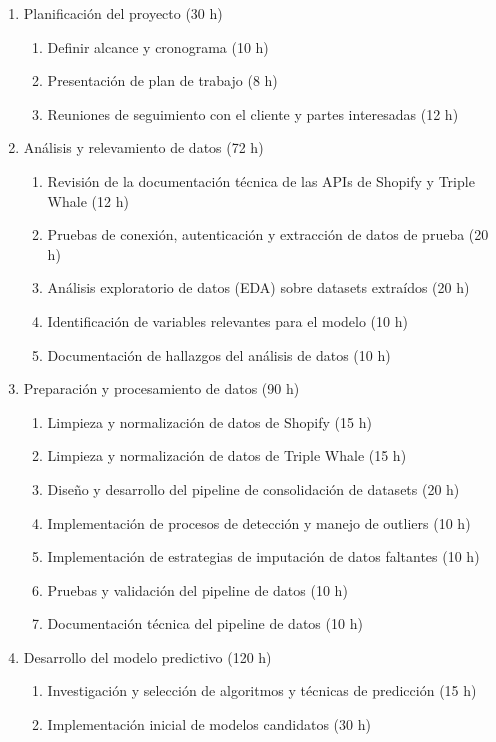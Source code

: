 \documentclass[
11pt, %
]{charter}
\begin{document}
\begin{enumerate}
\item Planificación del proyecto (30 h)
\begin{enumerate}

\item Definir alcance y cronograma (10 h)
\item Presentación de plan de trabajo (8 h)
\item Reuniones de seguimiento con el cliente y partes interesadas (12 h)
\end{enumerate}
\item Análisis y relevamiento de datos (72 h)
\begin{enumerate}
\item Revisión de la documentación técnica de las APIs de Shopify y Triple Whale (12 h)
\item Pruebas de conexión, autenticación y extracción de datos de prueba (20 h)
\item Análisis exploratorio de datos (EDA) sobre datasets extraídos (20 h)
\item Identificación de variables relevantes para el modelo (10 h)
\item Documentación de hallazgos del análisis de datos (10 h)
\end{enumerate}
\item Preparación y procesamiento de datos (90 h)
\begin{enumerate}
\item Limpieza y normalización de datos de Shopify (15 h)
\item Limpieza y normalización de datos de Triple Whale (15 h)
\item Diseño y desarrollo del pipeline de consolidación de datasets (20 h)
\item Implementación de procesos de detección y manejo de outliers (10 h)
\item Implementación de estrategias de imputación de datos faltantes (10 h)
\item Pruebas y validación del pipeline de datos (10 h)
\item Documentación técnica del pipeline de datos (10 h)
\end{enumerate}
\item Desarrollo del modelo predictivo (120 h)
\begin{enumerate}
\item Investigación y selección de algoritmos y técnicas de predicción (15 h)
\item Implementación inicial de modelos candidatos (30 h)

\end{enumerate}
\end{enumerate}
\end{document}
